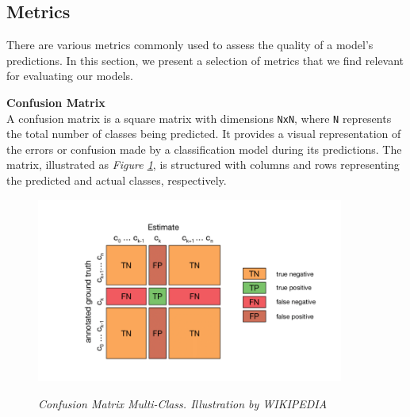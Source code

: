 \newpage

\subsection{Metrics}
{\label{sec:metrics}}

There are various metrics commonly used to assess the quality of a model's predictions.
In this section, we present a selection of metrics that we find relevant for evaluating our models.

\vspace{0.5cm}
\textbf{Confusion Matrix} \\

\noindent A confusion matrix is a square matrix with dimensions {\tt NxN}, where {\tt N} represents the total number of classes being predicted. It provides a visual representation of the errors or confusion made by a classification model during its predictions. The matrix, illustrated as \textit{Figure \ref{fig:confusion-matrix}}, is structured with columns and rows representing the predicted and actual classes, respectively.

\begin{figure}[H]
\begin{adjustbox}{trim={0pt 0.5cm 0pt 1cm}, clip}
\centering
\includegraphics[width=0.9\textwidth]{imatges/preliminaries/confusion-matrix.png}
\end{adjustbox}
\caption[Confusion Matrix Multi-Class]{\textit{Confusion Matrix Multi-Class. Illustration by WIKIPEDIA}}
{\label{fig:confusion-matrix}}
\end{figure}

